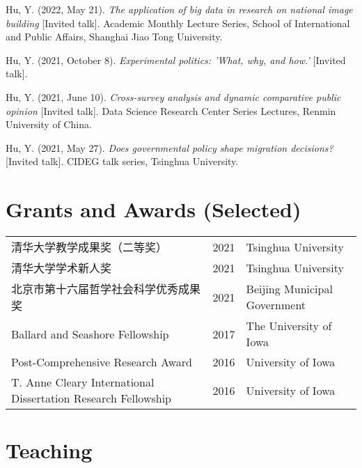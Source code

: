 \documentclass[
  12pt,
]
{article}
\newlength{\cslhangindent}
\newenvironment{CSLReferences}[2] %
 {\begin{list}{}{%
  \setlength{\itemindent}{0pt}
  \setlength{\leftmargin}{0pt}
  \setlength{\parsep}{0pt}
  \ifodd #1
   \setlength{\leftmargin}{\cslhangindent}
   \setlength{\itemindent}{-1\cslhangindent}
  \fi
  \setlength{\itemsep}{#2\baselineskip}}}
 {\end{list}}
\begin{document}
\begin{CSLReferences}{1}{0}
Hu, Y. (2022, May 21). \emph{The application of big data in research on
national image building} {[}Invited talk{]}. Academic Monthly Lecture
Series, School of International and Public Affairs, Shanghai Jiao Tong
University.

Hu, Y. (2021, October 8). \emph{Experimental politics: 'What, why, and
how.'} {[}Invited talk{]}.

Hu, Y. (2021, June 10). \emph{Cross-survey analysis and dynamic
comparative public opinion} {[}Invited talk{]}. Data Science Research
Center Series Lectures, Renmin University of China.

Hu, Y. (2021, May 27). \emph{Does governmental policy shape migration
decisions?} {[}Invited talk{]}. CIDEG talk series, Tsinghua University.

\end{CSLReferences}

\section{Grants and Awards (Selected)}\label{grants-and-awards-selected}

\begin{table}[!h]
\centering
\begin{tabular}{>{\raggedright\arraybackslash}p{25em}ll}

清华大学教学成果奖（二等奖） & 2021 & Tsinghua University\\
清华大学学术新人奖 & 2021 & Tsinghua University\\
北京市第十六届哲学社会科学优秀成果奖 & 2021 & Beijing Municipal Government\\
Ballard and Seashore Fellowship & 2017 & The University of Iowa\\
Post-Comprehensive Research Award & 2016 & University of Iowa\\
\addlinespace
T. Anne Cleary International Dissertation Research Fellowship & 2016 & University of Iowa\\

\end{tabular}
\end{table}

\section{Teaching}\label{teaching}
\end{document}
